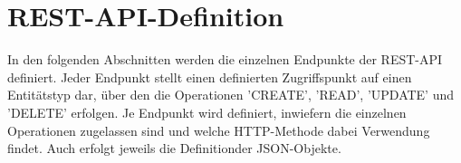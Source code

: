 \chapter{REST-API-Definition}
\label{sec:RESTAPIDefinition}

In den folgenden Abschnitten werden die einzelnen Endpunkte der REST-API definiert.
Jeder Endpunkt stellt einen definierten Zugriffspunkt auf einen Entitätstyp dar, über den die Operationen ’CREATE’, ’READ’, ’UPDATE’ und ’DELETE’ erfolgen. 
Je Endpunkt wird definiert, inwiefern die einzelnen Operationen zugelassen sind und welche HTTP-Methode dabei Verwendung findet. 
Auch erfolgt jeweils die Definitionder JSON-Objekte.







